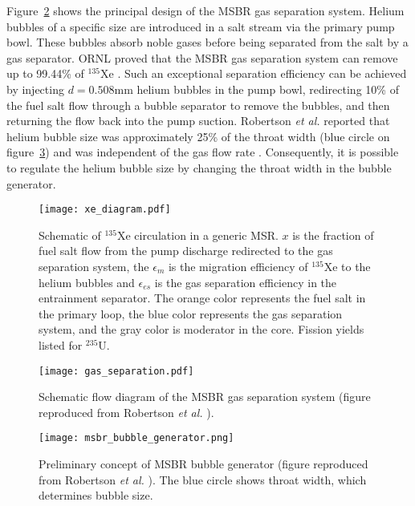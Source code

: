 
Figure~\ref{fig:gas_removal_system} shows the principal design of the  
\gls{MSBR} gas separation system. Helium bubbles of a specific size are 
introduced in a salt stream via the primary pump bowl. These bubbles absorb 
noble gases before being separated from the salt by a gas separator. 
\gls{ORNL} proved that the \gls{MSBR} gas separation system can remove up to 
99.44\% of $^{135}$Xe \cite{briggs_molten-salt_1969}. Such an exceptional 
separation efficiency can be achieved by injecting 
$d=0.508$mm helium bubbles in the pump bowl, redirecting 10\% of the fuel salt flow
through a bubble separator to remove the bubbles, and then returning the flow back into the 
pump suction. Robertson \emph{et al.} reported that helium bubble size was 
approximately 25\% of the throat width (blue circle on 
figure~\ref{fig:bubble_separator}) and was independent of the gas flow rate 
\cite{robertson_conceptual_1971}. Consequently, it is possible to regulate the 
helium bubble size by changing the throat width in the bubble generator.
\begin{figure}[htp!] %
	\centering
	\texttt{[image: xe\_diagram.pdf]}
	\caption{Schematic of $^{135}$Xe circulation in a generic \gls{MSR}. 
	$x$ is the fraction of fuel salt flow from the pump discharge redirected to 
	the gas separation system, the $\epsilon_m$ is the migration efficiency of 
	$^{135}$Xe to the helium bubbles and $\epsilon_{es}$ is the gas separation 
	efficiency in the entrainment separator. The orange color represents the 
	fuel salt in the primary loop,	the blue color represents the gas 
	separation system, and the gray color is moderator in the core. Fission 
	yields listed for $^{235}$U.}
	\label{fig:xe_diagram}
\end{figure}
\begin{figure}[htp!] %
  \centering
  \texttt{[image: gas\_separation.pdf]}
  \caption{Schematic flow diagram of the \gls{MSBR} gas separation system 
  (figure reproduced from Robertson \emph{et al.} 
  \cite{robertson_conceptual_1971}).}
  \label{fig:gas_removal_system}
\end{figure}
\begin{figure}[htp!] %
  \centering
  \texttt{[image: msbr\_bubble\_generator.png]}
  \caption{Preliminary concept of \gls{MSBR} bubble generator (figure 
  reproduced from Robertson \emph{et al.} \cite{robertson_conceptual_1971}). 
  The blue circle shows throat width, which determines bubble size.}
		\vspace{-0.25in}
  \label{fig:bubble_separator}
\end{figure}
